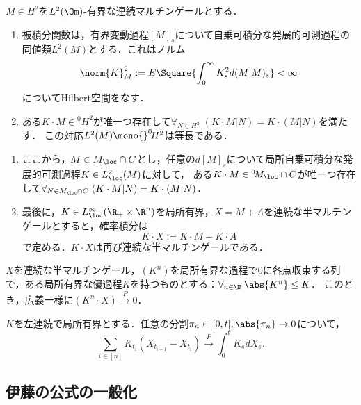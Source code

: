 \documentclass[uplatex,dvipdfmx]{jsreport}
\begin{document}
\begin{definition}
    $M\in H^2$を$L^2(\Om)$-有界な連続マルチンゲールとする．
    \begin{enumerate}
        \item 被積分関数は，有界変動過程$[M]_s$について自乗可積分な発展的可測過程の同値類$L^2(M)$とする．これはノルム\[\norm{K}_M^2:=E\Square{\int^\infty_0K_s^2d(M|M)_s}<\infty\]についてHilbert空間をなす．
        \item ある$K\cdot M\in{}^0\!H^2$が唯一つ存在して$\forall_{N\in H^2}\;(K\cdot M|N)=K\cdot(M|N)$を満たす．
        この対応$L^2(M)\mono {}^0\!H^2$は等長である．
    \end{enumerate}
\end{definition}

\begin{definition}\mbox{}
    \begin{enumerate}
        \item ここから，$M\in M_\loc\cap C$とし，任意の$d[M]_s$について局所自乗可積分な発展的可測過程$K\in L^2_\loc(M)$に対して，
        ある$K\cdot M\in {}^0\!M_\loc\cap C$が唯一つ存在して$\forall_{N\in M_\loc\cap C}\;(K\cdot M|N)=K\cdot(M|N)$．
        \item 最後に，$K\in L^\infty_\loc(\R_+\times\R^n)$を局所有界，$X=M+A$を連続な半マルチンゲールとすると，確率積分は
        \[K\cdot X:=K\cdot M+K\cdot A\]
        で定める．$K\cdot X$は再び連続な半マルチンゲールである．
    \end{enumerate}
\end{definition}

\begin{theorem}[優収束定理]
    $X$を連続な半マルチンゲール，$(K^n)$を局所有界な過程で$0$に各点収束する列で，ある局所有界な優過程$K$を持つものとする：$\forall_{n\in\N}\;\abs{K^n}\le K$．
    このとき，広義一様に$(K^n\cdot X)\xrightarrow{P}0$．
\end{theorem}

\begin{proposition}[Riemann和の極限としての特徴付け]
    $K$を左連続で局所有界とする．任意の分割$\pi_n\subset[0,t],\abs{\pi_n}\to0$について，
    \[\sum_{i\in[n]}K_{t_i}(X_{t_{i+1}}-X_{t_i})\xrightarrow{P}\int^t_0K_sdX_s.\]
\end{proposition}

\subsection{伊藤の公式の一般化}
\end{document}

